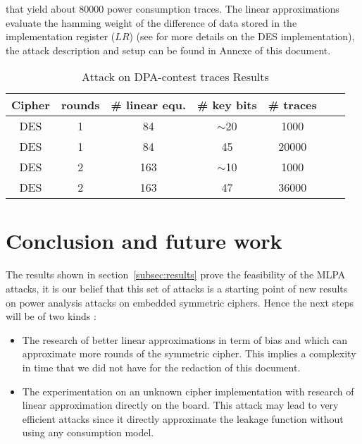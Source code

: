 \documentclass[11pt,a4paper]{article}
\begin{document}
{{{{{{{{{{{that yield about 80000 power consumption traces. The linear approximations evaluate the hamming weight of the difference of data stored in the implementation register ($LR$)
(see \cite{guilleyHoogvorstPascalet07} for more details on the DES implementation), the attack description and setup can be found in Annexe of this document.
\begin{table}[!h]
\begin{center}
\footnotesize{
\begin{tabular}{|c|c|c|c|c|c|c|}
\hline
Cipher & rounds & \# linear equ. & \# key bits & \# traces \\
\hline
\hline
DES    & 1      & 84            &  $\sim$20   &   1000    \\
DES    & 1      & 84            &    45       &   20000   \\
\hline
DES    & 2      & 163           &  $\sim$10   &   1000    \\
DES    & 2      & 163           &    47       &   36000   \\
\hline
\end{tabular}
\caption{Attack on DPA-contest traces Results}
\label{table:result_MLPA_contest}
}
\end{center}
\end{table}
\section{Conclusion and future work}
\paragraph{}
The results shown in section~\ref{subsec:results} prove the feasibility of the MLPA attacks, it is our belief that this set of attacks is a starting point of 
new results on power analysis attacks on embedded symmetric ciphers. Hence the next steps will be of two kinds :
\begin{itemize}
\item The research of better linear approximations in term of bias and which can approximate more rounds of the symmetric cipher. This implies a
complexity in time that we did not have for the redaction of this document. 
\item The experimentation on an unknown cipher implementation with research of linear approximation directly on the board. This attack may lead
to very efficient attacks since it directly approximate the leakage function without using any consumption model. 
\end{itemize}

}}}}}}}}}}}
\end{document}
